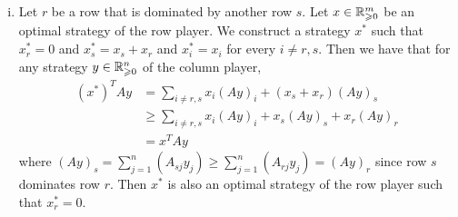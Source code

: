 \documentclass[11pt]{article}
\renewcommand{\geq}{\geqslant}
\begin{document}
\begin{enumerate}[1)]
\begin{solution}
\begin{enumerate}[(i)]
\item Let $r$ be a row that is dominated by another row $s$. Let $x\in \R^{m}_{\geq 0}$ be an optimal strategy of the row player. 
We construct a strategy $x^\ast$ such that $x^\ast_r = 0$ and $x^\ast_s = x_s + x_r$ and $x^\ast_i = x_i$ for every $i \neq r, s$. Then we have that for any strategy $y\in \R^{n}_{\geq 0}$ of the column player,
\begin{align*}
(x^\ast)^T A y & = \sum_{i \neq r, s} x_i (Ay)_i + (x_s + x_r) (Ay)_s \\
& \geq \sum_{i \neq r, s} x_i (Ay)_i + x_s (Ay)_s + x_r (Ay)_r \\
& = x^T A y
\end{align*}
where $(Ay)_s = \sum_{j=1}^n (A_{sj} y_j) \geq \sum_{j=1}^n (A_{rj} y_j) = (Ay)_r$ since row $s$ dominates row $r$. 
Then $x^\ast$ is also an optimal strategy of the row player such that $x^\ast_r = 0$. 


\end{enumerate}
\end{solution}
\end{enumerate}
\end{document}
